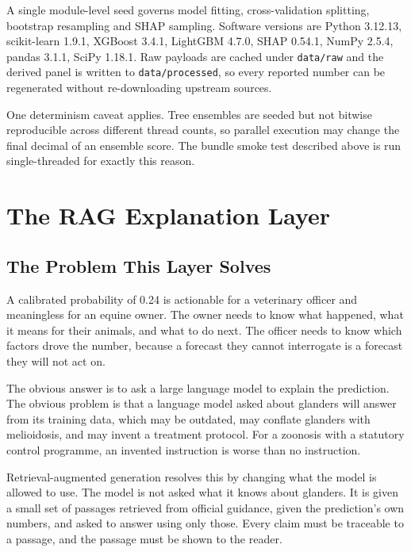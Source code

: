 \documentclass[10pt,openany]{report}
\begin{document}
A single module-level seed governs model fitting, cross-validation splitting, bootstrap resampling
and SHAP sampling. Software versions are Python 3.12.13, scikit-learn 1.9.1, XGBoost 3.4.1, LightGBM 4.7.0, SHAP 0.54.1, NumPy 2.5.4, pandas 3.1.1, SciPy 1.18.1. Raw payloads are cached under
\texttt{data/raw} and the derived panel is written to \texttt{data/processed}, so every reported
number can be regenerated without re-downloading upstream sources.

One determinism caveat applies. Tree ensembles are seeded but not bitwise reproducible across
different thread counts, so parallel execution may change the final decimal of an ensemble score.
The bundle smoke test described above is run single-threaded for exactly this reason.

\chapter{The RAG Explanation Layer}
\label{ch:rag}

\section{The Problem This Layer Solves}

A calibrated probability of 0.24 is actionable for a veterinary officer and meaningless for an
equine owner. The owner needs to know what happened, what it means for their animals, and what to
do next. The officer needs to know which factors drove the number, because a forecast they cannot
interrogate is a forecast they will not act on.

The obvious answer is to ask a large language model to explain the prediction. The obvious problem
is that a language model asked about glanders will answer from its training data, which may be
outdated, may conflate glanders with melioidosis, and may invent a treatment protocol. For a
zoonosis with a statutory control programme, an invented instruction is worse than no instruction.

Retrieval-augmented generation \cite{lewis2020} resolves this by changing what the model is
allowed to use. The
model is not asked what it knows about glanders. It is given a small set of passages retrieved
from official guidance, given the prediction's own numbers, and asked to answer using only those.
Every claim must be traceable to a passage, and the passage must be shown to the reader.
\end{document}
